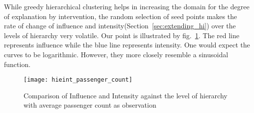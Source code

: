 







While greedy hierarchical clustering helps in increasing the domain for the degree of explanation by intervention, the random selection of seed points makes the rate of change of influence and intensity(Section~\ref{sec:extending_hi}) over the levels of hierarchy very volatile. Our point is illustrated by fig.~\ref{fig:hieint_passenger_count}. The red line represents influence while the blue line represents intensity. One would expect the curves to be logarithmic. However, they more closely resemble a sinusoidal function.
\begin{figure}[h]
\texttt{[image: hieint\_passenger\_count]}
\caption{Comparison of Influence and Intensity against the level of hierarchy with average passenger count as observation}
\label{fig:hieint_passenger_count}
\end{figure}

